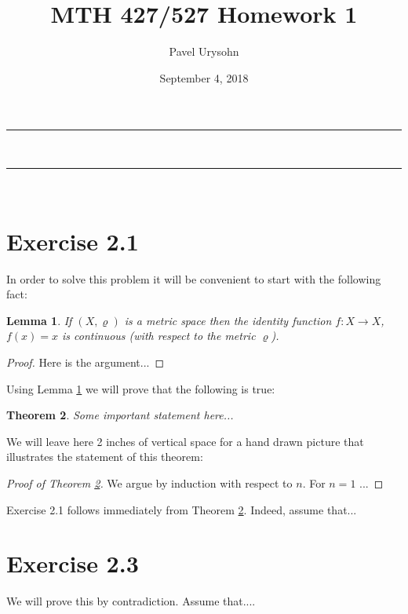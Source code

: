 \documentclass[11pt]{article}
\makeatletter
\newcommand{\nline}{\rule{\linewidth}{0.5pt}}
\theoremstyle{plain}
\newtheorem{theorem}{Theorem}
\newtheorem{lemma}[theorem]{Lemma}
\theoremstyle{definition}
\renewcommand{\maketitle}{
\begin{center}
\nline\\
\vspace{2ex}
{\huge \textsc{\@title}}
\nline\\
{\large\textsc{\@author \hfill \@date}}
\vspace{4ex}
\end{center}
}
\makeatother
\begin{document}
\title{MTH 427/527 Homework 1}

\author{Pavel Urysohn}

\date{September 4, 2018}

\maketitle



\section*{Exercise 2.1}

In order to solve this problem it will be convenient to start with the following fact:

\begin{lemma}
\label{HELPFUL LEMMA}
If $(X, \varrho)$ is a metric space then the identity function $f\colon X \to X$, $f(x) = x$ is continuous
(with respect to the metric $\varrho$). 
\end{lemma}


\begin{proof}
Here is the argument...
\end{proof}

Using Lemma \ref{HELPFUL LEMMA} we will prove that the following is true:

\begin{theorem}
\label{BIG THEOREM}
Some important statement here...
\end{theorem}

We will leave here 2 inches of vertical  space for a hand drawn picture that  illustrates the statement of 
this theorem:

\vskip 2in

\begin{proof}[Proof of Theorem \ref{BIG THEOREM}]
We argue by induction with respect to $n$. For $n=1$ ...
\end{proof}

Exercise 2.1 follows immediately from Theorem \ref{BIG THEOREM}. Indeed, assume that... 




\section*{Exercise 2.3}

We will prove this by contradiction. Assume that....
\end{document}
